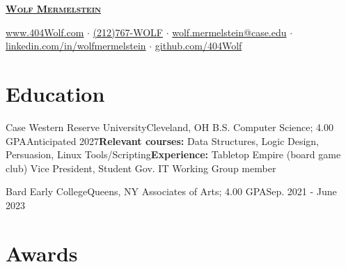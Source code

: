 \documentclass[letterpaper, 10pt]{article}
\begin{document}
	
	
	\begin{center}
		\textbf{\Huge \scshape \href{https://404wolf.com}{Wolf Mermelstein}} \\ \vspace{6pt}
		
		\href{https://404wolf.com}{www.404Wolf.com}
		$\cdot$
		\small \href{tel:(+12127679653)}{(212)767-WOLF}
		$\cdot$
		\href{mailto:wolf.mermelstein@case.edu}{wolf.mermelstein@case.edu}
		$\cdot$
		\href{https://linkedin.com/in/wolfmermelstein}{linkedin.com/in/wolfmermelstein}
		$\cdot$
		\href{https://github.com/404wolf}{github.com/404Wolf}
	\end{center}
	\vspace{-14px}
	
	\section{Education}
	\resumeSubHeadingListStart
	
	\twoLineResumeSubheading
	{Case Western Reserve University}{Cleveland, OH}{}
	{B.S. Computer Science; 4.00 GPA}{Anticipated 2027}{\textbf{Relevant courses:} Data Structures, Logic Design, Persuasion, Linux Tools/Scripting}{\textbf{Experience:} Tabletop Empire (board game club) Vice President, Student Gov. IT Working Group member}
	
	\resumeSubheading
	{Bard Early College}{Queens, NY}{}
	{Associates of Arts;  4.00 GPA}{Sep. 2021 - June 2023}{}
	\resumeSubHeadingListEnd
	
	\section{Awards}
	\resumeSubHeadingListStart
	
	
	
		
	\resumeSubHeadingListEnd
	
\end{document}
